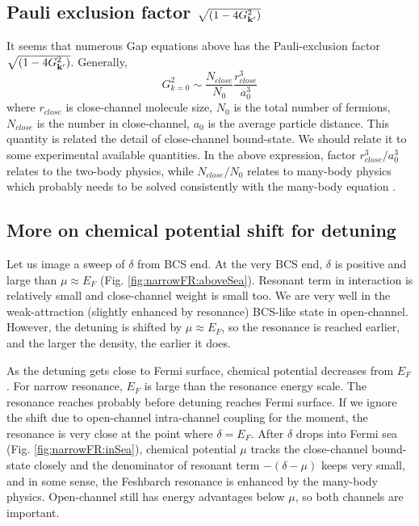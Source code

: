 \subsection{Pauli exclusion factor  $\sqrt{(1-4G_{\mathbf{k}'}^{2})}$ }
It seems that numerous Gap equations above has the Pauli-exclusion factor $\sqrt{(1-4G_{\mathbf{k}'}^{2})}$.  Generally, 
\begin{equation}
G_{k=0}^{2}\sim{\frac{N_{close}}{N_{0}}\frac{r_{close}^{3}}{a_{0}^{3}}}
\end{equation}
where $r_{close}$ is close-channel molecule size, $N_{0}$ is the total number of fermions, $N_{close}$ is the number in close-channel, $a_{0}$ is the average particle distance.  This quantity is related the detail of close-channel bound-state.  We should relate it to some experimental available quantities.  In the above expression, factor $r_{close}^{3}/a_{0}^{3}$ relates to the two-body physics, while $N_{close}/N_{0}$ relates to many-body physics which probably needs to be solved consistently with the many-body equation .  

\subsection{More on chemical potential shift for detuning}
Let us image a sweep of $\delta$ from BCS end.  At the very BCS end, $\delta$ is positive and large than $\mu\approx{}E_{F}$ (Fig. \ref{fig:narrowFR:aboveSea}). Resonant term in interaction is relatively small and close-channel weight is small too.  We are very well in the  weak-attraction (slightly enhanced by resonance) BCS-like state in open-channel.  However, the detuning is shifted by $\mu\approx{}E_{F}$, so the resonance is reached earlier, and the larger the density, the earlier it does.  

As the detuning gets close to Fermi surface, chemical potential decreases from $E_{F}$. For narrow resonance, $E_{F}$ is large than the resonance energy scale.  The resonance reaches probably before detuning reaches Fermi surface.  If we ignore the shift due to open-channel intra-channel coupling for the moment, the resonance is very close at the point where $\delta=E_{F}$.  After $\delta$ drops into Fermi sea (Fig. \ref{fig:narrowFR:inSea}), chemical potential $\mu$ tracks the close-channel bound-state closely and the denominator of resonant term $-(\delta-\mu)$ keeps very small, and in some sense, the Feshbarch resonance is enhanced by the many-body  physics.  Open-channel still has energy advantages below $\mu$, so both channels are important.  

